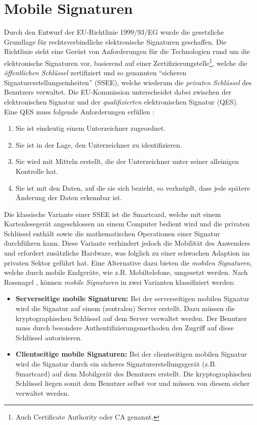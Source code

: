 \documentclass[11pt,a4paper,ngerman]{scrreprt}
\begin{document}
\section{Mobile Signaturen}\label{sec:MobileSignaturen}
Durch den Entwurf der EU-Richtlinie 1999/93/EG wurde die gesetzliche Grundlage für rechtsverbindliche elektronische Signaturen geschaffen. Die Richtlinie sieht eine Gerüst von Anforderungen für die Technologien rund um die elektronische Signaturen vor, basierend auf einer Zertifizierungstelle\footnote{Auch Certificate Authority oder CA genannt.}, welche die \emph{öffentlichen Schlüssel} zertifiziert und so genannten ``sicheren Signaturerstellungseinheiten'' (SSEE), welche wiederum die \emph{privaten Schlüssel} des Benutzers verwaltet. Die EU-Kommission unterscheidet dabei zwischen der elektronischen Signatur und der \emph{qualifizierten} elektronischen Signatur (QES). Eine QES muss folgende Anforderungen erfüllen \cite{eSigEU99}:
\begin{enumerate}
    \item Sie ist eindeutig einem Unterzeichner zugeordnet.
    \item Sie ist in der Lage, den Unterzeichner zu identifizieren.
    \item Sie wird mit Mitteln erstellt, die der Unterzeichner unter seiner alleinigen Kontrolle hat.
    \item Sie ist mit den Daten, auf die sie sich bezieht, so verknüpft, dass jede spätere Änderung der Daten erkennbar ist.
\end{enumerate}
Die klassische Variante einer SSEE ist die Smartcard, welche mit einem Kartenlesegerät angeschlossen an einem Computer bedient wird und die privaten Schlüssel enthält sowie die mathematischen Operationen einer Signatur durchführen kann. Diese Variante verhindert jedoch die Mobilität des Anwenders und erfordert zusätzliche Hardware, was folglich zu einer schwachen Adaption im privaten Sektor geführt hat. Eine Alternative dazu bieten die \textit{mobilen Signaturen}, welche durch mobile Endgeräte, wie z.B. Mobiltelefone, umgesetzt werden. Nach Rossnagel \cite{rossnagel}, können \textit{mobile Signaturen}   in zwei Varianten klassifiziert werden:
\begin{itemize}
    \item \textbf{Serverseitige mobile Signaturen:} Bei der serverseitigen mobilen Signatur wird die Signatur auf einem (zentralen) Server erstellt. Dazu müssen die kryptographischen Schlüssel auf dem Server verwaltet werden. Der Benutzer muss durch besondere Authentifizierungsmethoden den Zugriff auf diese Schlüssel autorisieren.
    \item \textbf{Clientseitige mobile Signaturen:} Bei der clientseitigen mobilen Signatur wird die Signatur durch ein sicheres Signaturerstellungsgerät (z.B. Smartcard) auf dem Mobilgerät des Benutzers erstellt. Die kryptographischen Schlüssel liegen somit dem Benutzer selbst vor und müssen von diesem sicher verwaltet werden.
\end{itemize}
\end{document}
